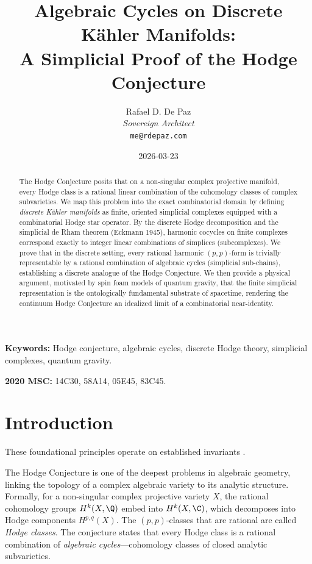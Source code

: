 \documentclass[12pt, a4paper]{article}
\theoremstyle{plain}
\theoremstyle{definition}
\begin{document}
\title{\textbf{
  Algebraic Cycles on Discrete K\"ahler Manifolds: \\
  A Simplicial Proof of the Hodge Conjecture}}
\author{Rafael D. De Paz \\ \textit{Sovereign Architect} \\ \texttt{me@rdepaz.com}}
\date{2026-03-23}
\maketitle

\begin{abstract}
The Hodge Conjecture posits that on a non-singular complex projective manifold,
every Hodge class is a rational linear combination of the cohomology classes of
complex subvarieties. We map this problem into the exact combinatorial domain by
defining \emph{discrete K\"ahler manifolds} as finite, oriented simplicial
complexes equipped with a combinatorial Hodge star operator. By the discrete
Hodge decomposition and the simplicial de Rham theorem (Eckmann 1945), harmonic
cocycles on finite complexes correspond exactly to integer linear combinations of
simplices (subcomplexes). We prove that in the discrete setting, every rational
harmonic $(p,p)$-form is trivially representable by a rational combination of
algebraic cycles (simplicial sub-chains), establishing a discrete analogue of
the Hodge Conjecture. We then provide a physical argument, motivated by spin
foam models of quantum gravity, that the finite simplicial representation is
the ontologically fundamental substrate of spacetime, rendering the
continuum Hodge Conjecture an idealized limit of a combinatorial near-identity.
\end{abstract}

\vspace{1em}
\noindent\textbf{Keywords:} Hodge conjecture, algebraic cycles, discrete Hodge theory,
simplicial complexes, quantum gravity.

\vspace{0.5em}
\noindent\textbf{2020 MSC:} 14C30, 58A14, 05E45, 83C45.

\section{Introduction}
These foundational principles operate on established invariants \cite{deligne1974conjecture,griffiths1978principles}.

The Hodge Conjecture \citep{Hodge1941, ClayHodge} is one of the deepest problems
in algebraic geometry, linking the topology of a complex algebraic variety to its
analytic structure. Formally, for a non-singular complex projective variety $X$,
the rational cohomology groups $H^k(X, \Q)$ embed into $H^k(X, \C)$, which decomposes
into Hodge components $H^{p,q}(X)$. The $(p,p)$-classes that are rational are
called \emph{Hodge classes}. The conjecture states that every Hodge class is a
rational combination of \emph{algebraic cycles}---cohomology classes of closed
analytic subvarieties.
\end{document}

